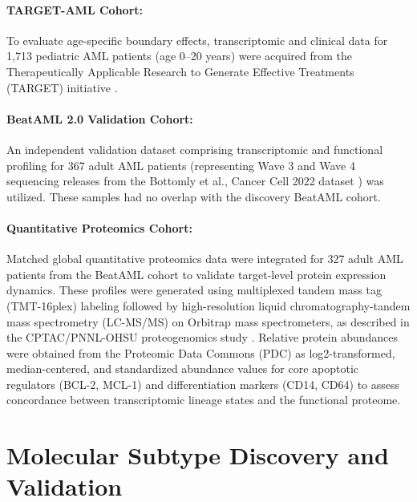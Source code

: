 \documentclass[11pt,a4paper]{article}
\begin{document}
\paragraph{TARGET-AML Cohort:} To evaluate age-specific boundary effects, transcriptomic and clinical data for 1,713 pediatric AML patients (age 0--20 years) were acquired from the Therapeutically Applicable Research to Generate Effective Treatments (TARGET) initiative \cite{bolouri2018target}.
\paragraph{BeatAML 2.0 Validation Cohort:} An independent validation dataset comprising transcriptomic and functional profiling for 367 adult AML patients (representing Wave 3 and Wave 4 sequencing releases from the Bottomly et al., Cancer Cell 2022 dataset \cite{bottomly2022}) was utilized. These samples had no overlap with the discovery BeatAML cohort.
\paragraph{Quantitative Proteomics Cohort:} Matched global quantitative proteomics data were integrated for 327 adult AML patients from the BeatAML cohort to validate target-level protein expression dynamics. These profiles were generated using multiplexed tandem mass tag (TMT-16plex) labeling followed by high-resolution liquid chromatography-tandem mass spectrometry (LC-MS/MS) on Orbitrap mass spectrometers, as described in the CPTAC/PNNL-OHSU proteogenomics study \cite{pino2024mapping}. Relative protein abundances were obtained from the Proteomic Data Commons (PDC) as log2-transformed, median-centered, and standardized abundance values for core apoptotic regulators (BCL-2, MCL-1) and differentiation markers (CD14, CD64) to assess concordance between transcriptomic lineage states and the functional proteome.

\section{Molecular Subtype Discovery and Validation}
\end{document}
